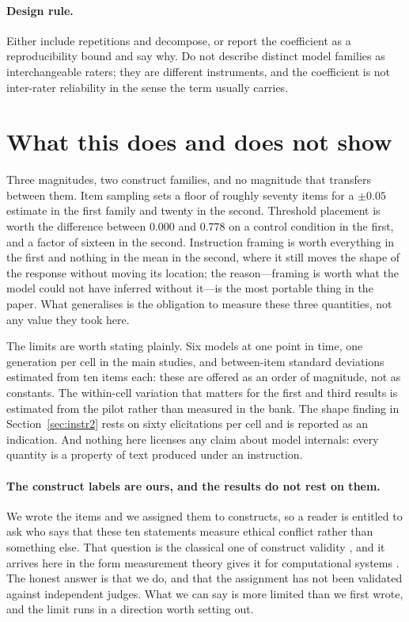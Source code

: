 \documentclass[11pt,letterpaper]{article}
\begin{document}
\paragraph{Design rule.} Either include repetitions and decompose, or report the coefficient as
a reproducibility bound and say why. Do not describe distinct model families as interchangeable
raters; they are different instruments, and the coefficient is not inter-rater reliability in
the sense the term usually carries.



\section{What this does and does not show}

Three magnitudes, two construct families, and no magnitude that transfers between them. Item
sampling sets a floor of roughly seventy items for a $\pm 0.05$ estimate in the first family and
twenty in the second. Threshold placement is worth the difference between $0.000$ and $0.778$ on
a control condition in the first, and a factor of sixteen in the second. Instruction framing is
worth everything in the first and nothing in the mean in the second, where it still moves the
shape of the response without moving its location; the reason---framing is worth what the model
could not have inferred without it---is the most portable thing in the paper. What generalises is the obligation to measure these three quantities, not any value they
took here.

The limits are worth stating plainly. Six models at one point in time, one generation per cell
in the main studies, and between-item standard deviations estimated from ten items each: these
are offered as an order of magnitude, not as constants. The within-cell variation that matters
for the first and third results is estimated from the pilot rather than measured in the bank.
The shape finding in Section~\ref{sec:instr2} rests on sixty elicitations per cell and is
reported as an indication. And nothing here licenses any claim about model internals: every
quantity is a property of text produced under an instruction.

\paragraph{The construct labels are ours, and the results do not rest on them.} We wrote the
items and we assigned them to constructs, so a reader is entitled to ask who says that these ten
statements measure ethical conflict rather than something else. That question is the classical
one of construct validity \citep{cronbachmeehl1955, messick1995}, and it arrives here in
the form measurement theory gives it for computational systems \citep{jacobs2021measurement}. The honest answer is that we do, and that the assignment has not
been validated against independent judges. What we can say is more limited than we first wrote, and the limit runs in a direction worth
setting out.
\end{document}
